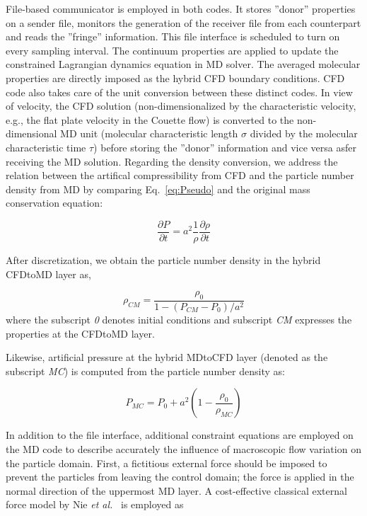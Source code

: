 \documentclass[preprint,12pt]{elsarticle}
\begin{document}
File-based communicator is employed in both codes. It stores ''donor'' properties on a sender file, monitors the generation of the receiver file from each counterpart and reads the ''fringe'' information. This file interface is scheduled to turn on every sampling interval. The continuum properties are applied to update the constrained Lagrangian dynamics equation in MD solver. The averaged molecular properties are directly imposed as the hybrid CFD boundary conditions. CFD code also takes care of the unit conversion between these distinct codes.
In view of velocity, the CFD solution (non-dimensionalized by the characteristic velocity, e.g., the flat plate velocity in the Couette flow) is converted to the non-dimensional MD unit (molecular characteristic length $\sigma$ divided by the molecular characteristic time $\tau$) before storing the ''donor'' information and vice versa asfer receiving the MD solution.
Regarding the density conversion, we address the relation between the artifical compressibility from CFD and the particle number density from MD by comparing Eq.~\ref{eq:Pseudo} and the original mass conservation equation: 

\vspace{-.2em}
\begin{equation}
\frac{\partial P}{\partial t} = a^2 \frac{1}{\rho} \frac{\partial \rho}{\partial t}
\label{eq:DensityConversion}
\end{equation}

After discretization, we obtain the particle number density in the hybrid CFDtoMD layer as,

\vspace{-.2em}
\begin{equation}
{\rho}_{CM} = \frac {{\rho}_{0}}{1- ({{P}_{CM}-{P}_{0}})/{{a}^{2}}}
\label{eq:NumberDensityCFDtoMD}
\end{equation}
where the subscript \textit{0} denotes initial conditions and subscript \textit{CM} expresses the properties at the CFDtoMD layer.

Likewise, artificial pressure at the hybrid MDtoCFD layer (denoted as the subscript \textit{MC}) is computed from the particle number density as:

\vspace{-.2em}
\begin{equation}
{P}_{MC} = {P}_{0} + {a}^{2} (1- \frac{{\rho}_{0}}{{\rho}_{MC}})
\label{eq:ArtificialPressureMDtoCFD}
\end{equation}


In addition to the file interface, additional constraint equations are employed on the MD code to describe accurately the influence of macroscopic flow variation on the particle domain. First, a fictitious external force should be imposed to prevent the particles from leaving the control domain; the force is applied in the normal direction of the uppermost MD layer. A cost-effective classical external force model by Nie {\it{et al.}}~\cite{Nie} is employed as
\end{document}
